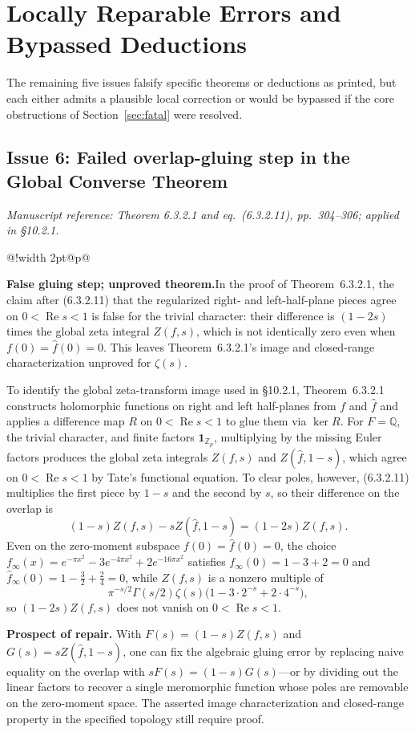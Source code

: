 \documentclass[11pt,letterpaper]{article}
\makeatletter
\newcommand{\msloc}[1]{%
  {\small\color{locgray}\itshape Manuscript reference: #1.}\par\nobreak\vspace{3pt}\@afterindentfalse\@afterheading
}
\newcommand{\issuefinding}[2]{%
  \begingroup
  \setlength{\fboxsep}{0pt}%
  \noindent\colorbox{barbg}{%
    \begin{tabular}{@{}!{\color{baraccent}\vrule width 2pt}@{\hspace{8pt}}p{\dimexpr\linewidth-18pt\relax}@{\hspace{8pt}}}
      \rule{0pt}{11.5pt}\small\textbf{\color{baraccent}#1}\enspace #2\rule[-4.5pt]{0pt}{0pt}
    \end{tabular}%
  }%
  \endgroup
  \par\nobreak\vspace{4.5pt}\@afterindentfalse\@afterheading
}
\newcommand{\Q}{\mathbb{Q}}
\newcommand{\Z}{\mathbb{Z}}
\DeclareMathOperator{\RePt}{Re}
\makeatother
\begin{document}
\section{Locally Reparable Errors and Bypassed Deductions}
\label{sec:reparable}

The remaining five issues falsify specific theorems or deductions as printed, but each either admits a plausible local correction or would be bypassed if the core obstructions of Section~\ref{sec:fatal} were resolved.

\subsection{Issue 6: Failed overlap-gluing step in the Global Converse Theorem}
\msloc{Theorem 6.3.2.1 and eq.~(6.3.2.11), pp.~304--306; applied in \S10.2.1}
\issuefinding{False gluing step; unproved theorem.}{In the proof of Theorem~6.3.2.1, the claim after (6.3.2.11) that the regularized right- and left-half-plane pieces agree on $0<\RePt s<1$ is false for the trivial character: their difference is $(1-2s)$ times the global zeta integral $Z(f,s)$, which is not identically zero even when $f(0)=\widehat{f}(0)=0$. This leaves Theorem~6.3.2.1's image and closed-range characterization unproved for $\zeta(s)$.}

To identify the global zeta-transform image used in \S10.2.1, Theorem~6.3.2.1 constructs holomorphic functions on right and left half-planes from $f$ and $\widehat{f}$ and applies a difference map $R$ on $0<\RePt s<1$ to glue them via $\ker R$. For $F=\Q$, the trivial character, and finite factors $\mathbf{1}_{\Z_p}$, multiplying by the missing Euler factors produces the global zeta integrals $Z(f,s)$ and $Z(\widehat{f},1-s)$, which agree on $0<\RePt s<1$ by Tate's functional equation. To clear poles, however, (6.3.2.11) multiplies the first piece by $1-s$ and the second by $s$, so their difference on the overlap is
\[
  (1-s)Z(f,s) - s Z(\widehat{f},1-s) = (1-2s)Z(f,s).
\]
Even on the zero-moment subspace $f(0)=\widehat{f}(0)=0$, the choice $f_\infty(x) = e^{-\pi x^2} - 3e^{-4\pi x^2} + 2e^{-16\pi x^2}$ satisfies $f_\infty(0) = 1-3+2=0$ and $\widehat{f}_\infty(0) = 1 - \tfrac{3}{2} + \tfrac{2}{4} = 0$, while $Z(f,s)$ is a nonzero multiple of
\[
  \pi^{-s/2}\Gamma(s/2)\zeta(s)\bigl(1 - 3\cdot 2^{-s} + 2\cdot 4^{-s}\bigr),
\]
so $(1-2s)Z(f,s)$ does not vanish on $0 < \RePt s < 1$.

\textbf{Prospect of repair.} With $F(s)=(1-s)Z(f,s)$ and $G(s)=sZ(\widehat{f},1-s)$, one can fix the algebraic gluing error by replacing naive equality on the overlap with $sF(s) = (1-s)G(s)$---or by dividing out the linear factors to recover a single meromorphic function whose poles are removable on the zero-moment space. The asserted image characterization and closed-range property in the specified topology still require proof.
\end{document}
